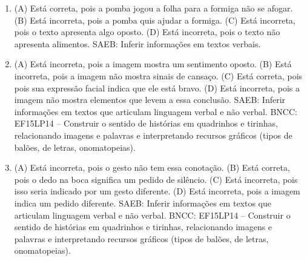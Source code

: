 \begin{enumerate}
\item
(A) Está correta, pois a pomba jogou a folha para a formiga não se afogar.
(B) Está incorreta, pois a pomba quis ajudar a formiga.
(C) Está incorreta, pois o texto apresenta algo oposto.
(D) Está incorreta, pois o texto não apresenta alimentos.
SAEB: Inferir informações em textos verbais.

\item
(A) Está incorreta, pois a imagem mostra um sentimento oposto.
(B) Está incorreta, pois a imagem não mostra sinais de cansaço.
(C) Está correta, pois pois sua expressão facial indica que ele está bravo.
(D) Está incorreta, pois a imagem não mostra elementos que levem a essa conclusão.
SAEB: Inferir informações em textos que articulam linguagem verbal e não verbal.
BNCC: EF15LP14 -- Construir o sentido de histórias em quadrinhos
e tirinhas, relacionando imagens e palavras e interpretando recursos
gráficos (tipos de balões, de letras, onomatopeias).

\item
(A) Está incorreta, pois o gesto não tem essa conotação.
(B) Está correta, pois o dedo na boca significa um pedido de silêncio.
(C) Está incorreta, pois isso seria indicado por um gesto diferente.
(D) Está incorreta, pois a imagem indica um pedido diferente.
SAEB: Inferir informações em textos que articulam linguagem
verbal e não verbal.
BNCC: EF15LP14 -- Construir o sentido de histórias em quadrinhos
e tirinhas, relacionando imagens e palavras e interpretando recursos
gráficos (tipos de balões, de letras, onomatopeias).
\end{enumerate}


